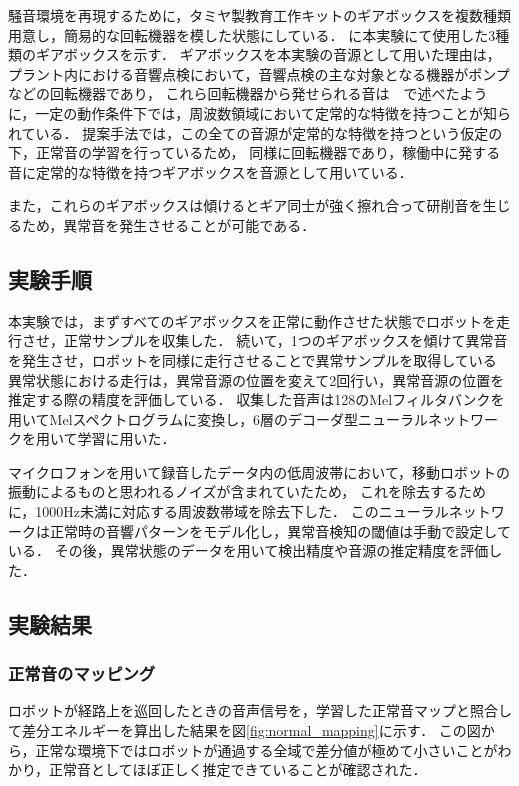 \documentclass[../main]{subfiles}
\begin{document}
騒音環境を再現するために，タミヤ製教育工作キットのギアボックスを複数種類用意し，簡易的な回転機器を模した状態にしている．
に本実験にて使用した3種類のギアボックスを示す．
ギアボックスを本実験の音源として用いた理由は，プラント内における音響点検において，音響点検の主な対象となる機器がポンプなどの回転機器であり，
これら回転機器から発せられる音は　で述べたように，一定の動作条件下では，周波数領域において定常的な特徴を持つことが知られている．
提案手法では，この全ての音源が定常的な特徴を持つという仮定の下，正常音の学習を行っているため，
同様に回転機器であり，稼働中に発する音に定常的な特徴を持つギアボックスを音源として用いている．

また，これらのギアボックスは傾けるとギア同士が強く擦れ合って研削音を生じるため，異常音を発生させることが可能である．
\subsection{実験手順} \label{subsec:experiment_procedure}

本実験では，まずすべてのギアボックスを正常に動作させた状態でロボットを走行させ，正常サンプルを収集した．
続いて，1つのギアボックスを傾けて異常音を発生させ，ロボットを同様に走行させることで異常サンプルを取得している
異常状態における走行は，異常音源の位置を変えて2回行い，異常音源の位置を推定する際の精度を評価している．
収集した音声は128のMelフィルタバンクを用いてMelスペクトログラムに変換し，6層のデコーダ型ニューラルネットワークを用いて学習に用いた．

マイクロフォンを用いて録音したデータ内の低周波帯において，移動ロボットの振動によるものと思われるノイズが含まれていたため，
これを除去するために，1000Hz未満に対応する周波数帯域を除去下した．
このニューラルネットワークは正常時の音響パターンをモデル化し，異常音検知の閾値は手動で設定している．
その後，異常状態のデータを用いて検出精度や音源の推定精度を評価した．

\subsection{実験結果} \label{subsec:vexp_ref_result}

\subsubsection{正常音のマッピング} \label{subsubsec:normal_mapping}

ロボットが経路上を巡回したときの音声信号を，学習した正常音マップと照合して差分エネルギーを算出した結果を図\ref{fig:normal_mapping}に示す．
この図から，正常な環境下ではロボットが通過する全域で差分値が極めて小さいことがわかり，正常音としてほぼ正しく推定できていることが確認された．
\end{document}
